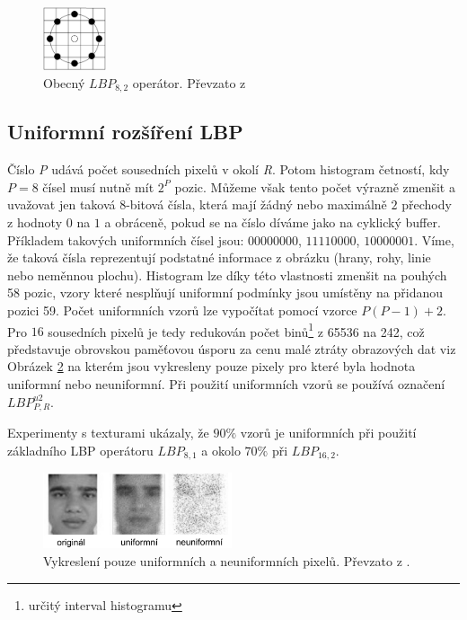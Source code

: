 \documentclass[czech,BP]{thesiskiv}
\begin{document}
\begin{figure}[h!]
\begin{center}
\includegraphics[width=70px]{img/circular_lbp.png}
\caption{Obecný $LBP_{8,2}$ operátor. Převzato z \cite{Ahonen2004}}
\label{fig:lbp_circular}
\end{center}
\end{figure}

\subsection{Uniformní rozšíření LBP} \label{uniform_lbp}
Číslo \textit{P} udává počet sousedních pixelů v okolí \textit{R}. Potom histogram četností, kdy $P=8$ čísel musí nutně mít $2^P$ pozic. Můžeme však tento počet výrazně zmenšit a uvažovat jen taková $8$-bitová čísla, která mají žádný nebo maximálně $2$ přechody z hodnoty $0$ na $1$ a obráceně, pokud se na číslo díváme jako na cyklický buffer. Příkladem takových uniformních čísel jsou: $00000000$, $11110000$, $10000001$. Víme, že taková čísla reprezentují podstatné informace z obrázku (hrany, rohy, linie nebo neměnnou plochu). Histogram lze díky této vlastnosti zmenšit na pouhých 58 pozic, vzory které nesplňují uniformní podmínky jsou umístěny na přidanou pozici 59. Počet uniformních vzorů lze vypočítat pomocí vzorce $P(P-1)+2$. Pro $16$ sousedních pixelů je tedy redukován počet binů\footnote{určitý interval histogramu} z 65536 na 242, což představuje obrovskou paměťovou úsporu za cenu malé ztráty obrazových dat viz Obrázek \ref{fig:uniform_non_uniform} na kterém jsou vykresleny pouze pixely pro které byla hodnota uniformní nebo neuniformní. Při použití uniformních vzorů se používá označení $LBP_{P,R}^{u2}$.

\citet{Ahonen2004} Experimenty s texturami ukázaly, že $90\%$ vzorů je uniformních při použití základního LBP operátoru $LBP_{8,1}$ a okolo $70\%$ při $LBP_{16,2}$.

\begin{figure}[h!]
\begin{center}
\includegraphics[width=210px]{img/uniform_non_uniform.png}
\caption{Vykreslení pouze uniformních a neuniformních pixelů. Převzato z \cite{Rahim2013}.}
\label{fig:uniform_non_uniform}
\end{center}
\end{figure}
\end{document}
